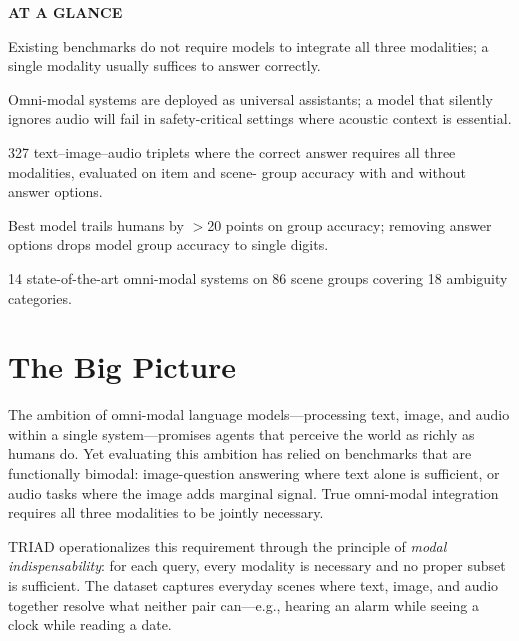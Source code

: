 \documentclass[10pt,twocolumn]{article}
\begin{document}
\begin{mdframed}[backgroundcolor=boxgray,linecolor=rulered,linewidth=1pt,
    innerleftmargin=6pt,innerrightmargin=6pt,
    innertopmargin=6pt,innerbottommargin=6pt]
\textbf{\small AT A GLANCE}\par\vspace{4pt}
\begin{description}[leftmargin=0pt,labelsep=4pt,itemsep=2pt,parsep=0pt,
    font=\small\bfseries]
  \item[Problem:] Existing benchmarks do not require models to
    integrate all three modalities; a single modality usually suffices
    to answer correctly.
  \item[Why it matters:] Omni-modal systems are deployed as universal
    assistants; a model that silently ignores audio will fail in
    safety-critical settings where acoustic context is essential.
  \item[Method:] 327 text--image--audio triplets where the correct
    answer requires all three modalities, evaluated on item and scene-
    group accuracy with and without answer options.
  \item[Result:] Best model trails humans by $>$20 points on group
    accuracy; removing answer options drops model group accuracy to
    single digits.
  \item[Evidence:] 14 state-of-the-art omni-modal systems on 86 scene
    groups covering 18 ambiguity categories.
\end{description}
\end{mdframed}

\section{The Big Picture}

The ambition of omni-modal language models---processing text, image,
and audio within a single system---promises agents that perceive the
world as richly as humans do. Yet evaluating this ambition has relied
on benchmarks that are functionally bimodal: image-question answering
where text alone is sufficient, or audio tasks where the image adds
marginal signal. True omni-modal integration requires all three
modalities to be jointly necessary.

TRIAD operationalizes this requirement through the principle of
\emph{modal indispensability}: for each query, every modality is
necessary and no proper subset is sufficient. The dataset captures
everyday scenes where text, image, and audio together resolve what
neither pair can---e.g., hearing an alarm while seeing a clock while
reading a date.
\end{document}
